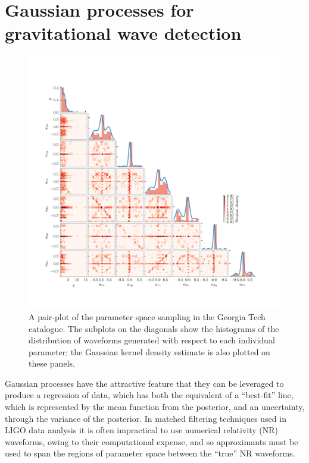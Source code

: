 \documentclass[openleft]{kentigern}
\theoremstyle{definition}
\begin{document}
\section{Gaussian processes for gravitational wave detection}
\label{sec:gauss-proc-grav}

\begin{figure}
  \centering
  \includegraphics{figures/georgiatech-density-plot.pdf}
  \caption{A pair-plot of the parameter space sampling in the Georgia
    Tech catalogue. The subplots on the diagonals show the histograms
    of the distribution of waveforms generated with respect to each
    individual parameter; the Gaussian kernel density estimate is also
    plotted on these panels.}
  \label{fig:georgiatech-pairplot}
\end{figure}
Gaussian processes have the attractive feature that they can be
leveraged to produce a regression of data, which has both the
equivalent of a ``best-fit'' line, which is represented by the mean
function from the posterior, and an uncertainty, through the variance
of the posterior. In matched filtering techniques used in LIGO data
analysis it is often impractical to use numerical relativity (NR)
waveforms, owing to their computational expense, and so approximants
must be used to span the regions of parameter space between the
``true'' NR waveforms.
\end{document}
